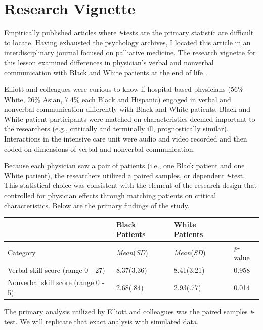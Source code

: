 \documentclass[
  11pt,
]{book}
\begin{document}
\hypertarget{research-vignette-3}{%
\section{Research Vignette}\label{research-vignette-3}}

Empirically published articles where \emph{t}-tests are the primary statistic are difficult to locate. Having exhausted the psychology archives, I located this article in an interdisciplinary journal focused on palliative medicine. The research vignette for this lesson examined differences in physician's verbal and nonverbal communication with Black and White patients at the end of life \citep{elliott_differences_2016}.

Elliott and colleagues \citeyearpar{elliott_differences_2016} were curious to know if hospital-based physicians (56\% White, 26\% Asian, 7.4\% each Black and Hispanic) engaged in verbal and nonverbal communication differently with Black and White patients. Black and White patient participants were matched on characteristics deemed important to the researchers (e.g., critically and terminally ill, prognostically similar). Interactions in the intensive care unit were audio and video recorded and then coded on dimensions of verbal and nonverbal communication.

Because each physician saw a pair of patients (i.e., one Black patient and one White patient), the researchers utilized a paired samples, or dependent \emph{t}-test. This statistical choice was consistent with the element of the research design that controlled for physician effects through matching patients on critical characteristics. Below are the primary findings of the study.

\begin{longtable}[]{@{}llll@{}}
\toprule\noalign{}
& Black Patients & White Patients & \\
\midrule\noalign{}
\endhead
\bottomrule\noalign{}
\endlastfoot
Category & \emph{Mean}(\emph{SD}) & \emph{Mean}(\emph{SD}) & \emph{p}-value \\
Verbal skill score (range 0 - 27) & 8.37(3.36) & 8.41(3.21) & 0.958 \\
Nonverbal skill score (range 0 - 5) & 2.68(.84) & 2.93(.77) & 0.014 \\
\end{longtable}

The primary analysis utilized by Elliott and colleagues \citeyearpar{elliott_differences_2016} was the paired samples \emph{t}-test. We will replicate that exact analysis with simulated data.
\end{document}
